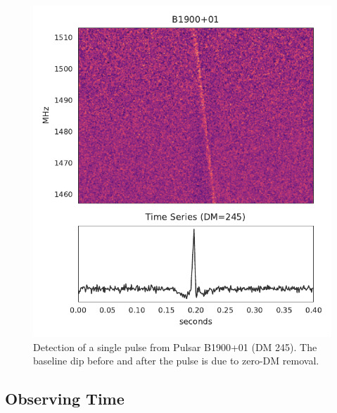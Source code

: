 \documentclass[a4paper,fleqn,usenatbib]{mnras}
\begin{document}
\begin{figure}
    \includegraphics[width=1.0\linewidth]{figures/B1900_01.pdf}
    \caption{Detection of a single pulse from Pulsar B1900+01 (DM 245). The
    baseline dip before and after the pulse is due to zero-DM removal.
    }
    \label{fig:B1900}
\end{figure}



\subsection{Observing Time}
\label{sec:obs_time}
\end{document}
